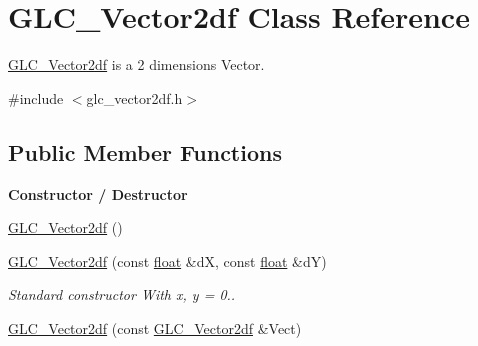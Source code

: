 \hypertarget{class_g_l_c___vector2df}{\section{G\-L\-C\-\_\-\-Vector2df Class Reference}
\label{class_g_l_c___vector2df}
}


\hyperlink{class_g_l_c___vector2df}{G\-L\-C\-\_\-\-Vector2df} is a 2 dimensions Vector.  




{\ttfamily \#include $<$glc\-\_\-vector2df.\-h$>$}

\subsection*{Public Member Functions}
\begin{Indent}{\bf Constructor / Destructor}\par
\begin{DoxyCompactItemize}
\item 
\hyperlink{class_g_l_c___vector2df_a40c87960008b1ab2f806bd0cf8c2d6e6}{G\-L\-C\-\_\-\-Vector2df} ()
\item 
\hyperlink{class_g_l_c___vector2df_af3a6bad9a09470ccee0a92c5a00597fc}{G\-L\-C\-\_\-\-Vector2df} (const \hyperlink{_super_l_u_support_8h_a6a1bb6ed41f44b60e7bd83b0e9945aa7}{float} \&d\-X, const \hyperlink{_super_l_u_support_8h_a6a1bb6ed41f44b60e7bd83b0e9945aa7}{float} \&d\-Y)
\begin{DoxyCompactList}\small\item\em Standard constructor With x, y = 0.. \end{DoxyCompactList}\item 
\hyperlink{class_g_l_c___vector2df_ab30a186b88fa62f1cf2452992403d4a3}{G\-L\-C\-\_\-\-Vector2df} (const \hyperlink{class_g_l_c___vector2df}{G\-L\-C\-\_\-\-Vector2df} \&Vect)
\end{DoxyCompactItemize}
\end{Indent}
